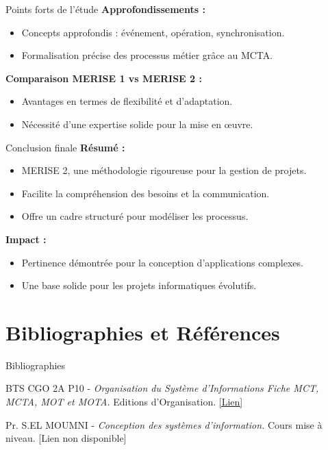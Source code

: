 \documentclass{beamer}
\begin{document}
\begin{frame}{Points forts de l'étude}
    \textbf{Approfondissements :}
    \begin{itemize}
        \item Concepts approfondis : événement, opération, synchronisation.
        \item Formalisation précise des processus métier grâce au MCTA.
    \end{itemize}
    \vspace{0.5cm}
    \textbf{Comparaison MERISE 1 vs MERISE 2 :}
    \begin{itemize}
        \item Avantages en termes de flexibilité et d'adaptation.
        \item Nécessité d'une expertise solide pour la mise en œuvre.
    \end{itemize}
\end{frame}

\begin{frame}{Conclusion finale}
    \textbf{Résumé :}
    \begin{itemize}
        \item MERISE 2, une méthodologie rigoureuse pour la gestion de projets.
        \item Facilite la compréhension des besoins et la communication.
        \item Offre un cadre structuré pour modéliser les processus.
    \end{itemize}
    \vspace{0.5cm}
    \textbf{Impact :}
    \begin{itemize}
        \item Pertinence démontrée pour la conception d'applications complexes.
        \item Une base solide pour les projets informatiques évolutifs.
    \end{itemize}
\end{frame}



\section{Bibliographies et Références}
\begin{frame}{Bibliographies}
\begin{thebibliography}{9}

BTS CGO 2A P10 -\textit{ Organisation du Système d’Informations Fiche MCT, MCTA, MOT et MOTA.} Editions d'Organisation. 
\href{https://bit.ly/3D5q0Gw}{[Lien]} 

Pr. S.EL MOUMNI -\textit{ Conception des systèmes d’information.} Cours mise à niveau. 
\alert{[Lien non disponible]}

\end{thebibliography}
\end{frame}
\end{document}
